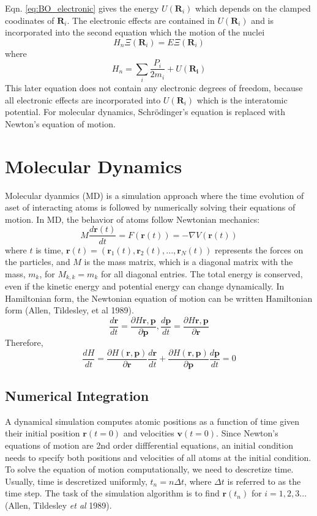 Eqn. \ref{eq:BO_electronic} gives the energy $U(\bm{R}_i)$ which depends on the clamped coodinates of $\bm{R}_i$.  The electronic effects are contained in $U(\bm{R}_i)$ and is incorporated into the second equation which the motion of the nuclei
\begin{equation}
\label{eq:BO_nuclei}
    H_n\Xi(\bm{R}_i)=E\Xi(\bm{R}_i)
\end{equation}
where
\begin{equation}
\label{eq:H_n}
    H_n = \sum_i \frac{P_i}{2m_i} + U(\bm{R_i})
\end{equation}
This later equation does not contain any electronic degrees of freedom, because all electronic effects are incorporated into $U(\bm{R}_i)$ which is the interatomic potential.  For molecular dynamics, Schr\"{o}dinger's equation is replaced with Newton's equation of motion.
\section{Molecular Dynamics}
Molecular dyanmics (MD) is a simulation approach where the time evolution of aset of interacting atoms is followed by numerically solving their equations of motion.  In MD, the behavior of atoms follow Newtonian mechanics:
\begin{equation}
    M\frac{d\bm{r}(t)}{dt} = F(\bm{r}(t))=-\nabla V(\bm{r}(t))
\end{equation}
where $t$ is time, $\bm{r}(t) = (\bm{r}_1(t),\bm{r}_2(t),...,\bm{r}_N(t))$ represents the forces on the particles, and $M$ is the mass matrix, which is a diagonal matrix with the mass, $m_k$, for $M_{k,k}=m_k$ for all diagonal entries.
The total energy is conserved, even if the kinetic energy and potential energy can change dynamically.  In Hamiltonian form, the Newtonian equation of motion can be written Hamiltonian form (Allen, Tildesley, et al 1989).
\begin{equation}
	\frac{d \bm{r}}{dt}=\frac{\partial H{\bm{r},\bm{p}}}{\partial \bm{p}},
	\frac{d \bm{p}}{dt}=\frac{\partial H{\bm{r},\bm{p}}}{\partial \bm{r}}
\end{equation}
Therefore,
\begin{equation}
	\frac{dH}{dt}=\frac{\partial H(\bm{r},\bm{p})}{\partial \bm{r}} \frac{d\bm{r}}{dt}
						   +\frac{\partial H(\bm{r},\bm{p})}{\partial \bm{p}} \frac{d\bm{p}}{dt} = 0
\end{equation}

\subsection{Numerical Integration}
A dynamical simulation computes atomic positions as a function of time given their initial position $\bm{r}(t=0)$ and velocities $\bm{v}(t=0)$.  Since Newton's equations of motion are 2nd order diffferential equations, an initial condition needs to specify both positions and velocities of all atoms at the initial condition.  To solve the equation of motion computationally, we need to descretize time.  Usually, time is descretized uniformly, $t_n=n\Delta t$, where $\Delta t$ is referred to as the time step.  The task of the simulation algorithm is to find $\bm{r}(t_n)$ for $i=1,2,3...$ (Allen, Tildesley \emph{et al} 1989).

